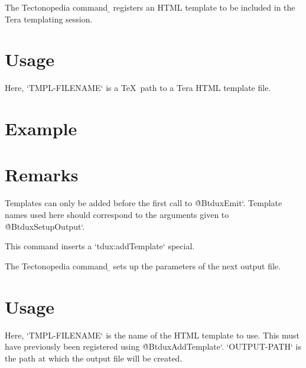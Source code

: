 
The Tectonopedia command \b{\string\tduxAddTemplate} registers an HTML template
to be included in the Tera templating session.

\section*{Usage}

\begin{texdisp}
\end{texdisp}

Here, \tex`TMPL-FILENAME` is a \TeX\ path to a Tera HTML template file.

\section*{Example}

\begin{texdisp}
\end{texdisp}

\section*{Remarks}

Templates can only be added before the first call to \`@BtduxEmit`. Template
names used here should correspond to the arguments given to
\`@BtduxSetupOutput`.

This command inserts a \tex`tdux:addTemplate` special.

\tduxEmit



The Tectonopedia command \b{\string\tduxSetupOutput} sets up the parameters of
the next output file.

\section*{Usage}

\begin{texdisp}
\end{texdisp}

Here, \tex`TMPL-FILENAME` is the name of the HTML template to use. This must
have previously been registered using \`@BtduxAddTemplate`. \tex`OUTPUT-PATH` is
the path at which the output file will be created.

